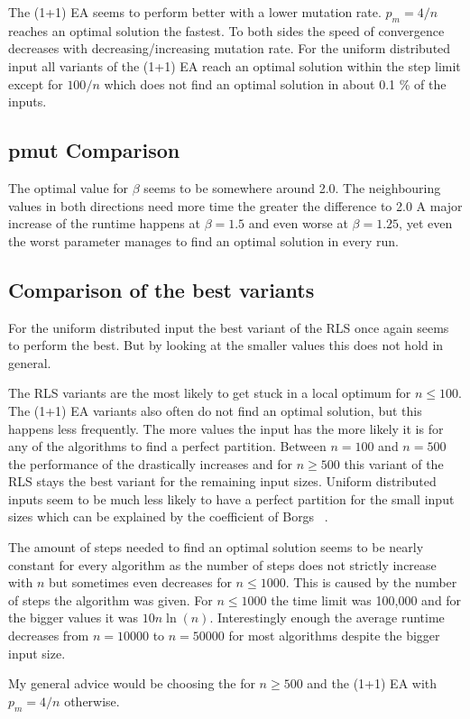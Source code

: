 The (1+1) EA seems to perform better with a lower mutation rate.
$p_m=4/n$ reaches an optimal solution the fastest.
To both sides the speed of convergence decreases with decreasing/increasing mutation rate.
For the uniform distributed input all variants of the (1+1) EA reach an optimal solution within the step limit except for $100/n$ which does not find an optimal solution in about 0.1 \% of the inputs.
\subsection{pmut Comparison}


The optimal value for $\beta$ seems to be somewhere around 2.0.
The neighbouring values in both directions need more time the greater the difference to 2.0
A major increase of the runtime happens at $\beta=1.5$ and even worse at $\beta=1.25$, yet even the worst parameter manages to find an optimal solution in every run.

\subsection{Comparison of the best variants}
% 
% 
For the uniform distributed input the best variant of the RLS once again seems to perform the best.
But by looking at the smaller values this does not hold in general.



The RLS variants are the most likely to get stuck in a local optimum for $n\le100$.
The (1+1) EA variants also often do not find an optimal solution, but this happens less frequently.
The more values the input has the more likely it is for any of the algorithms to find a perfect partition.
Between $n=100$ and $n=500$ the performance of the \RLSN[2] drastically increases and for $n\ge500$ this variant of the RLS stays the best variant for the remaining input sizes.
Uniform distributed inputs seem to be much less likely to have a perfect partition for the small input sizes which can be explained by the coefficient of Borgs \etal~\cite{borgs2001phase}.



The amount of steps needed to find an optimal solution seems to be nearly constant for every algorithm as the number of steps does not strictly increase with $n$ but sometimes even decreases for $n\le1000$.
This is caused by the number of steps the algorithm was given.
For $n\le1000$ the time limit was 100,000 and for the bigger values it was $10n\ln(n)$.
Interestingly enough the average runtime decreases from $n=10000$ to $n=50000$ for most algorithms despite the bigger input size.



My general advice would be choosing the \RLSN[2] for $n\ge500$ and the (1+1) EA with $p_m=4/n$ otherwise.
